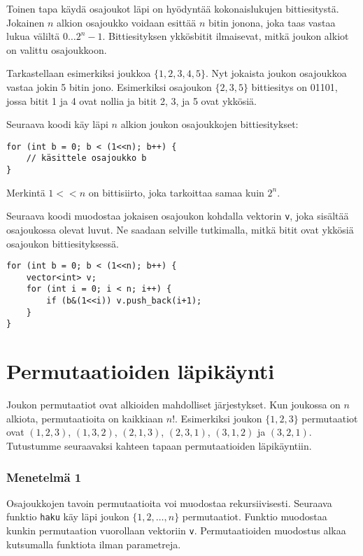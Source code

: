 Toinen tapa käydä osajoukot läpi on hyödyntää kokonaislukujen
bittiesitystä. Jokainen $n$ alkion osajoukko
voidaan esittää $n$ bitin jonona,
joka taas vastaa lukua väliltä $0 \ldots 2^n-1$.
Bittiesityksen ykkösbitit ilmaisevat,
mitkä joukon alkiot on valittu osajoukkoon.

Tarkastellaan esimerkiksi joukkoa $\{1,2,3,4,5\}$.
Nyt jokaista joukon osajoukkoa vastaa jokin
5 bitin jono.
Esimerkiksi osajoukon $\{2,3,5\}$ bittiesitys on 01101,
jossa bitit 1 ja 4 ovat nollia
ja bitit 2, 3, ja 5 ovat ykkösiä.

Seuraava koodi käy läpi $n$ alkion joukon
osajoukkojen bittiesitykset:

\begin{lstlisting}
for (int b = 0; b < (1<<n); b++) {
    // käsittele osajoukko b
}
\end{lstlisting}

Merkintä $1 < < n$ on bittisiirto,
joka tarkoittaa samaa kuin $2^n$.

Seuraava koodi muodostaa jokaisen osajoukon
kohdalla vektorin \texttt{v},
joka sisältää osajoukossa olevat luvut.
Ne saadaan selville tutkimalla, mitkä bitit ovat
ykkösiä osajoukon bittiesityksessä.

\begin{lstlisting}
for (int b = 0; b < (1<<n); b++) {
    vector<int> v;
    for (int i = 0; i < n; i++) {
        if (b&(1<<i)) v.push_back(i+1);
    }
}
\end{lstlisting}

\section{Permutaatioiden läpikäynti}


Joukon permutaatiot ovat alkioiden mahdolliset
järjestykset.
Kun joukossa on $n$ alkiota,
permutaatioita on kaikkiaan $n!$.
Esimerkiksi joukon $\{1,2,3\}$
permutaatiot ovat $(1,2,3)$, $(1,3,2)$,
$(2,1,3)$, $(2,3,1)$, $(3,1,2)$ ja $(3,2,1)$.
Tutustumme seuraavaksi kahteen tapaan
permutaatioiden läpikäyntiin.

\subsubsection{Menetelmä 1}

Osajoukkojen tavoin permutaatioita voi muodostaa
rekursiivisesti.
Seuraava funktio \texttt{haku} käy läpi
joukon $\{1,2,\ldots,n\}$ permutaatiot.
Funktio muodostaa kunkin permutaation
vuorollaan vektoriin \texttt{v}.
Permutaatioiden muodostus alkaa kutsumalla
funktiota ilman parametreja.

